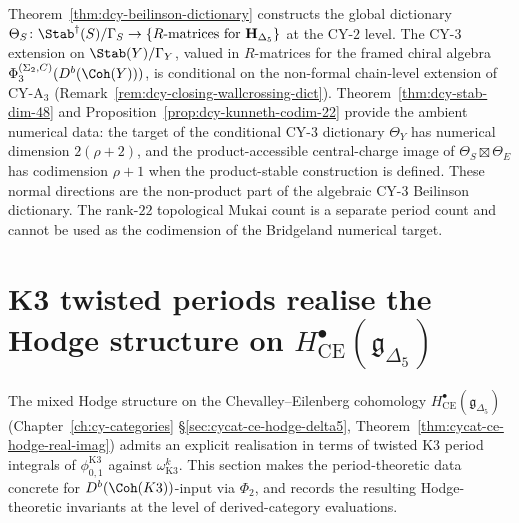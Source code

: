 \begin{remark}
\label{rem:dcy-stab-ke-beilinson-relation}
Theorem~\ref{thm:dcy-beilinson-dictionary} constructs the global dictionary $\Theta_S \colon \Stab^\dagger(S)/\Gamma_S \to \{R\text{-matrices for }\mathbf{H}_{\Delta_5}\}$ at the CY-$2$ level. The CY-$3$ extension on $\Stab(Y)/\Gamma_Y$, valued in $R$-matrices for the framed chiral algebra $\Phi_3^{(\Sigma_2,C)}(D^b(\Coh(Y)))$, is conditional on the non-formal chain-level extension of CY-A$_3$ (Remark~\ref{rem:dcy-closing-wallcrossing-dict}). Theorem~\ref{thm:dcy-stab-dim-48} and Proposition~\ref{prop:dcy-kunneth-codim-22} provide the ambient numerical data: the target of the conditional CY-$3$ dictionary $\Theta_Y$ has numerical dimension $2(\rho+2)$, and the product-accessible central-charge image of $\Theta_S \boxtimes \Theta_E$ has codimension $\rho+1$ when the product-stable construction is defined. These normal directions are the non-product part of the algebraic CY-$3$ Beilinson dictionary. The rank-$22$ topological Mukai count is a separate period count and cannot be used as the codimension of the Bridgeland numerical target.
\end{remark}

\section{K3 twisted periods realise the Hodge structure on \texorpdfstring{$H^\bullet_{\mathrm{CE}}(\mathfrak{g}_{\Delta_5})$}{H-.-CE(g-Delta-5)}}
\label{sec:dcy-k3-twisted-periods-ce}

The mixed Hodge structure on the Chevalley--Eilenberg cohomology
$H^\bullet_{\mathrm{CE}}(\mathfrak{g}_{\Delta_5})$
(Chapter~\textup{\ref{ch:cy-categories}}
\S\textup{\ref{sec:cycat-ce-hodge-delta5}},
Theorem~\textup{\ref{thm:cycat-ce-hodge-real-imag}}) admits an explicit
realisation in terms of twisted K3 period integrals of
$\phi_{0,1}^{\mathrm{K3}}$ against $\omega_{\mathrm{K3}}^k$. This section
makes the period-theoretic data concrete for $D^b(\Coh(K3))$-input via
$\Phi_2$, and records the resulting Hodge-theoretic invariants at
the level of derived-category evaluations.

